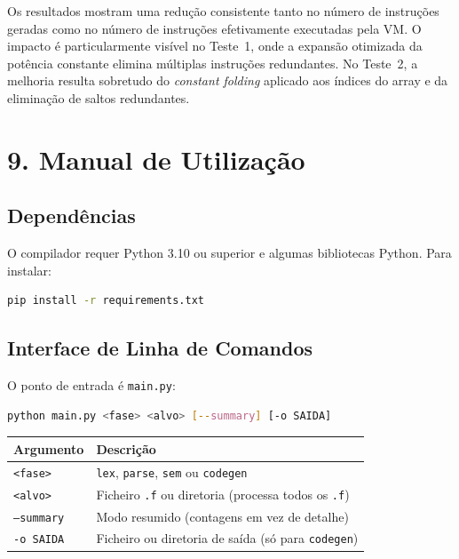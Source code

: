 \documentclass[a4paper]{article}
\begin{document}
\vspace{0.2cm}

\noindent Os resultados mostram uma redução consistente tanto no número de instruções geradas como no número de instruções efetivamente executadas pela VM. O impacto é particularmente visível no Teste~1, onde a expansão otimizada da potência constante elimina múltiplas instruções redundantes. No Teste~2, a melhoria resulta sobretudo do \textit{constant folding} aplicado aos índices do array e da eliminação de saltos redundantes.

\section*{9. Manual de Utilização}
\label{sec:manual}

\subsection*{Dependências}

O compilador requer Python 3.10 ou superior e algumas bibliotecas Python. Para instalar:

\begin{lstlisting}[language=bash, basicstyle=\ttfamily\small, frame=single]
pip install -r requirements.txt
\end{lstlisting}

\subsection*{Interface de Linha de Comandos}

O ponto de entrada é \texttt{main.py}:

\begin{lstlisting}[language=bash, basicstyle=\ttfamily\small, frame=single]
python main.py <fase> <alvo> [--summary] [-o SAIDA]
\end{lstlisting}

\begin{center}
\begin{tabular}{ll}
\toprule
\textbf{Argumento} & \textbf{Descrição} \\
\midrule
\texttt{<fase>}     & \texttt{lex}, \texttt{parse}, \texttt{sem} ou \texttt{codegen} \\
\texttt{<alvo>}     & Ficheiro \texttt{.f} ou diretoria (processa todos os \texttt{.f}) \\
\texttt{--summary}  & Modo resumido (contagens em vez de detalhe) \\
\texttt{-o SAIDA}   & Ficheiro ou diretoria de saída (só para \texttt{codegen}) \\
\bottomrule
\end{tabular}
\end{center}
\end{document}
